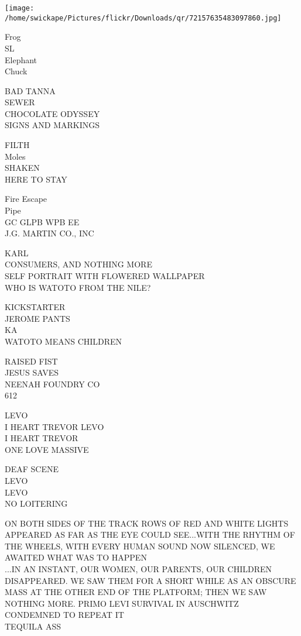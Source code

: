 \documentclass[10pt,letterpaper]{article}
\begin{document}
\texttt{[image: /home/swickape/Pictures/flickr/Downloads/qr/72157635483097860.jpg]}


Frog\\
SL\\
Elephant\\
Chuck

BAD TANNA\\
SEWER\\
CHOCOLATE ODYSSEY\\
SIGNS AND MARKINGS

FILTH\\
Moles\\
SHAKEN\\
HERE TO STAY

Fire Escape\\
Pipe\\
GC GLPB WPB EE\\
J.G. MARTIN CO., INC

KARL\\
CONSUMERS, AND NOTHING MORE\\
SELF PORTRAIT WITH FLOWERED WALLPAPER\\
WHO IS WATOTO FROM THE NILE?

KICKSTARTER\\
JEROME PANTS\\
KA\\
WATOTO MEANS CHILDREN

RAISED FIST\\
JESUS SAVES\\
NEENAH FOUNDRY CO\\
612

LEVO\\
I HEART TREVOR LEVO\\
I HEART TREVOR\\
ONE LOVE MASSIVE

DEAF SCENE\\
LEVO\\
LEVO\\
NO LOITERING

ON BOTH SIDES OF THE TRACK ROWS OF RED AND WHITE LIGHTS APPEARED AS FAR AS THE EYE COULD SEE...WITH THE RHYTHM OF THE WHEELS, WITH EVERY HUMAN SOUND NOW SILENCED, WE AWAITED WHAT WAS TO HAPPEN\\
...IN AN INSTANT, OUR WOMEN, OUR PARENTS, OUR CHILDREN DISAPPEARED.  WE SAW THEM FOR A SHORT WHILE AS AN OBSCURE MASS AT THE OTHER END OF THE PLATFORM; THEN WE SAW NOTHING MORE.  PRIMO LEVI  SURVIVAL IN AUSCHWITZ\\
CONDEMNED TO REPEAT IT\\
TEQUILA ASS
\end{document}
